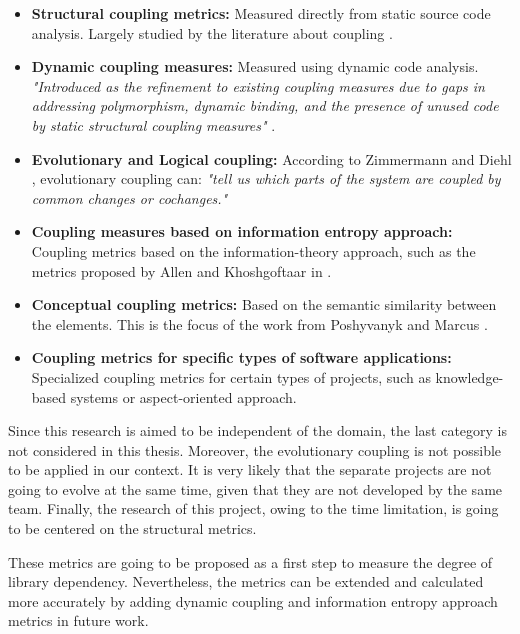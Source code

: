 \begin{itemize}
  \item \textbf{Structural coupling metrics:} Measured directly from static source code analysis. Largely studied by the literature about coupling \cite{briand1999unified, poshyvanyk2006conceptual, briand1997investigation, eder1994coupling}.

  \item \textbf{Dynamic coupling measures:} Measured using dynamic code analysis. \textit{"Introduced as the refinement to existing coupling measures due to gaps in addressing polymorphism, dynamic binding, and the presence of unused code by static structural coupling measures"} \cite{poshyvanyk2006conceptual}.

  \item \textbf{Evolutionary and Logical coupling:} According to Zimmermann and Diehl \cite{zimmermann2005mining}, evolutionary coupling can: \textit{"tell us which parts of the system are coupled by common changes or cochanges."}

  \item \textbf{Coupling measures based on information entropy approach:} Coupling metrics based on the information-theory approach, such as the metrics proposed by Allen and Khoshgoftaar in \cite{allen1999measuring}.

  \item \textbf{Conceptual coupling metrics:} Based on the semantic similarity between the elements. This is the focus of the work from Poshyvanyk and Marcus \cite{poshyvanyk2006conceptual}.

  \item \textbf{Coupling metrics for specific types of software applications:} Specialized coupling metrics for certain types of projects, such as knowledge-based systems or aspect-oriented approach.
\end{itemize}

\blankl
Since this research is aimed to be independent of the domain, the last category is not considered in this thesis. Moreover, the evolutionary coupling is not possible to be applied in our context. It is very likely that the separate projects are not going to evolve at the same time, given that they are not developed by the same team. Finally, the research of this project, owing to the time limitation, is going to be centered on the structural metrics.

These metrics are going to be proposed as a first step to measure the degree of library dependency. Nevertheless, the metrics can be extended and calculated more accurately by adding dynamic coupling and information entropy approach metrics in future work.

